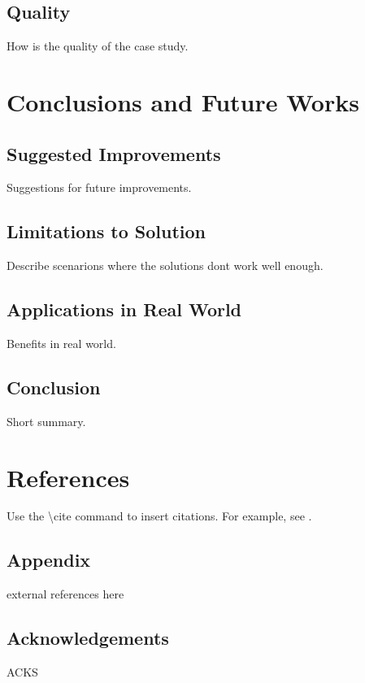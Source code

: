 \documentclass{article}
\begin{document}
\subsection{Quality}
How is the quality of the case study.

\section{Conclusions and Future Works}
\subsection{Suggested Improvements}
Suggestions for future improvements.

\subsection{Limitations to Solution}
Describe scenarions where the solutions dont work well enough.

\subsection{Applications in Real World}
Benefits in real world.

\subsection{Conclusion}
Short summary.

\section{References}
Use the \textbackslash cite command to insert citations. For example, see \cite{reference1}.

\subsection{Appendix}
external references here

\subsection{Acknowledgements}
ACKS



\end{document}
